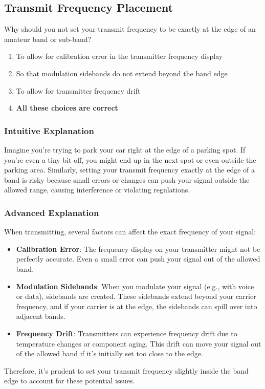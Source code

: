 \subsection{Transmit Frequency Placement}
\label{T1B09}

\begin{tcolorbox}[colback=gray!10!white,colframe=black!75!black,title=T1B09]
Why should you not set your transmit frequency to be exactly at the edge of an amateur band or sub-band?
\begin{enumerate}[label=\Alph*),noitemsep]
    \item To allow for calibration error in the transmitter frequency display
    \item So that modulation sidebands do not extend beyond the band edge
    \item To allow for transmitter frequency drift
    \item \textbf{All these choices are correct}
\end{enumerate}
\end{tcolorbox}

\subsubsection*{Intuitive Explanation}
Imagine you're trying to park your car right at the edge of a parking spot. If you're even a tiny bit off, you might end up in the next spot or even outside the parking area. Similarly, setting your transmit frequency exactly at the edge of a band is risky because small errors or changes can push your signal outside the allowed range, causing interference or violating regulations.

\subsubsection*{Advanced Explanation}
When transmitting, several factors can affect the exact frequency of your signal:
\begin{itemize}
    \item \textbf{Calibration Error}: The frequency display on your transmitter might not be perfectly accurate. Even a small error can push your signal out of the allowed band.
    \item \textbf{Modulation Sidebands}: When you modulate your signal (e.g., with voice or data), sidebands are created. These sidebands extend beyond your carrier frequency, and if your carrier is at the edge, the sidebands can spill over into adjacent bands.
    \item \textbf{Frequency Drift}: Transmitters can experience frequency drift due to temperature changes or component aging. This drift can move your signal out of the allowed band if it's initially set too close to the edge.
\end{itemize}
Therefore, it's prudent to set your transmit frequency slightly inside the band edge to account for these potential issues.
